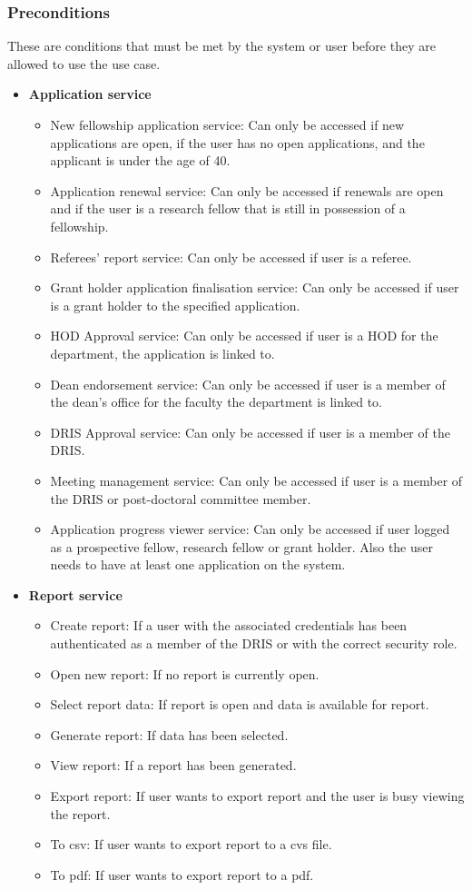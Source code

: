 \documentclass[12pt]{article}
\begin{document}
\subsubsection{Preconditions}
These are conditions that must be met by the system or user before they are allowed to use the use case.\\
\begin{itemize}
	\item\textbf{ Application service}
		\begin{itemize}
			\item New fellowship application service: Can only be accessed if new applications are open, if the user has no open applications, and the applicant is under the age of 40.
			\item Application renewal service: Can only be accessed if renewals are open and if the user is a research fellow that is still in possession of a fellowship.
			\item Referees' report service:  Can only be accessed if user is a referee.
			\item Grant holder application finalisation service:  Can only be accessed if user is a grant holder to the specified application.
			\item HOD Approval service:  Can only be accessed if user is a HOD for the department, the application is linked to.
			\item Dean endorsement service:  Can only be accessed if user is a member of the dean's office for the faculty the department is linked to.
			\item DRIS Approval service:  Can only be accessed if user is a member of the DRIS.
			\item Meeting management service:  Can only be accessed if user is a member of the DRIS or post-doctoral committee member.
			\item Application progress viewer service: Can only be accessed if user logged as a prospective fellow, research fellow or grant holder. Also the user needs to have at least one application on the system.	
		\end{itemize}
	
	\item \textbf{Report service}
		\begin{itemize}
			\item Create report: If a user with the associated credentials has been authenticated as a member of the DRIS or with the correct security role.
			\item Open new report: If no report is currently open.
			\item Select report data: If report is open and data is available for report.
			\item Generate report: If data has been selected.
			\item View report: If a report has been generated.
			\item Export report: If user wants to export report and the user is busy viewing the report.
			\item To csv: If user wants to export report to a cvs file.
			\item To pdf: If user wants to export report to a pdf.	
		\end{itemize}
	

\end{itemize}
\end{document}
